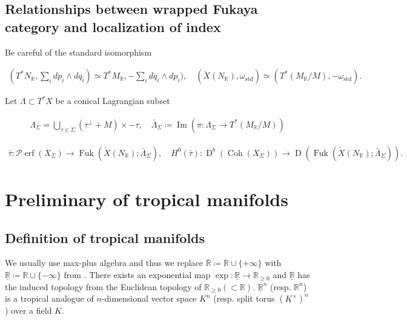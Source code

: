 \documentclass[a4paper,dvipdfmx,reqno,12pt]{amsart}
\theoremstyle{definition}
\newcommand{\deq}{\coloneqq}
\newcommand{\R}{\mathbb{R}}%
\newcommand{\mcal}[1]{\mathcal{#1}}%
\newcommand{\opn}[1]{\operatorname{#1}}
\numberwithin{equation}{section}
\begin{document}
\subsection{Relationships between wrapped Fukaya category and localization of index}

Be careful of the standard isomorphism

\begin{align}
  (T^*N_{\R},\sum _idp_i\wedge dq_i)
  \simeq T^{*}M_{\R},-\sum_i dq_i\wedge dp_i),
  \quad (\check{X}(N_{\R}),\omega_{\opn{std}})\simeq (T^{*}(M_{\R}/M),-\omega_{\opn{std}}).
\end{align}

Let $\Lambda \subset T^{*}X$ be a conical Lagrangian subset

\begin{align}
  \Lambda_{\Sigma} =
  \bigcup_{\tau \in \Sigma}(\tau^{\bot} +M)\times -\tau,
  \quad \bar{\Lambda}_{\Sigma}\deq \opn{Im}(\pi:\Lambda_{\Sigma} \to T^{*}(M_{\R}/M))
\end{align}

\cite[Theorem 2, Corollary 2]{MR2871160}

\begin{align}
  \bar{\tau}:\mcal{P}\!\opn{erf}(X_{\Sigma})
  \to \opn{Fuk}(\check{X}(N_{\R});\bar{\Lambda}_{\Sigma}), \quad
  H^{0}(\bar{\tau}): \opn{D}^{b}(\opn{Coh}(X_{\Sigma}))\to
  \opn{D}(\opn{Fuk}(\check{X}(N_{\R});\bar{\Lambda}_{\Sigma})).
\end{align}

\cite{MR3173401}



\section{Preliminary of tropical manifolds}

\subsection{Definition of tropical manifolds}

We usually use max-plus algebra and thus we replace $\overline{\R}\deq \R \cup \{+\infty\}$ with $\underline{\R}\deq \R \cup\{-\infty\}$ from \cite{gross2019sheaftheoretic}.
There exists an exponential map $\opn{exp}: \underline{\R} \to \R_{\geq 0}$ and $\underline{\R}$ has the induced topology from the Euclidean topology of $\R_{\geq 0} (\subset \R)$. 
$\underline{\R}^{n}$ (resp. $\R^{n}$) is a tropical analogue of $n$-dimensional vector space $K^{n}$ (resp. split torus $(K^{\times})^{n}$) over a field $K$.
\end{document}
